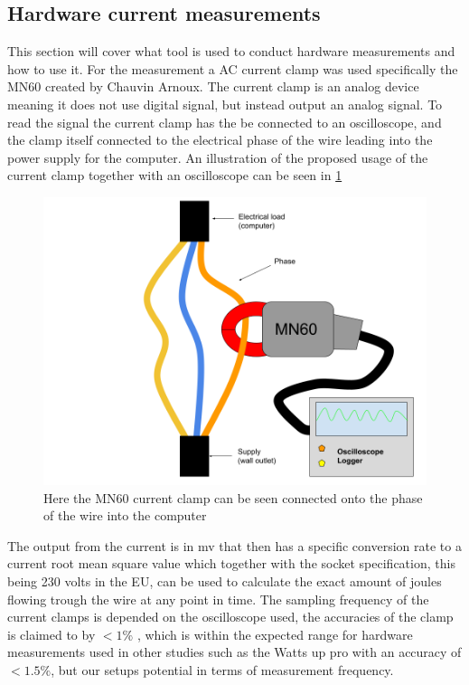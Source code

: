 \subsection{Hardware current measurements}
This section will cover what tool is used to conduct hardware measurements and how to use it. For the measurement a AC current clamp was used specifically the MN60 created by Chauvin Arnoux. The current clamp is an analog device meaning it does not use digital signal, but instead output an analog signal. To read the signal the current clamp has the be connected to an oscilloscope, and the clamp itself connected to the electrical phase of the wire leading into the power supply for the computer. An illustration of the proposed usage of the current clamp together with an oscilloscope can be seen in \cref{fig:clampSetup}
\begin{figure}[h!]
    \centering
    \includegraphics*[scale=0.4]{figures/CLAMP.png}
    \caption{Here the MN60 current clamp can be seen connected onto the phase of the wire into the computer}
    \label{fig:clampSetup}
\end{figure}
The output from the current is in mv that then has a specific conversion rate to a current root mean square value which together with the socket specification, this being 230 volts in the EU, can be used to calculate the exact amount of joules flowing trough the wire at any point in time. The sampling frequency of the current clamps is depended on the oscilloscope used, the accuracies of the clamp is claimed to by $<1\%$ \cite{ClampDoc}, which is within the expected range for hardware measurements used in other studies such as the Watts up pro with an accuracy of $<1.5\%$, but our setups potential in terms of measurement frequency.